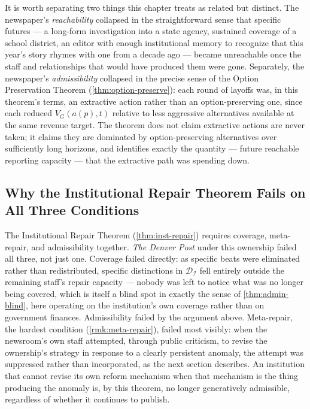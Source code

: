 \documentclass[12pt,twoside,openright]{book}
\begin{document}
It is worth separating two things this chapter treats as
related but distinct. The newspaper's \emph{reachability}
collapsed in the straightforward sense that specific futures ---
a long-form investigation into a state agency, sustained
coverage of a school district, an editor with enough institutional
memory to recognize that this year's story rhymes with one from
a decade ago --- became unreachable once the staff and
relationships that would have produced them were gone.
Separately, the newspaper's \emph{admissibility} collapsed in the
precise sense of the Option Preservation Theorem
(\cref{thm:option-preserve}): each round of layoffs was, in this
theorem's terms, an extractive action rather than an
option-preserving one, since each reduced $V_G(a(p), t)$ relative
to less aggressive alternatives available at the same
revenue target. The theorem does not claim extractive actions
are never taken; it claims they are dominated by option-preserving
alternatives over sufficiently long horizons, and identifies
exactly the quantity --- future reachable reporting capacity ---
that the extractive path was spending down.

\subsection{Why the Institutional Repair Theorem Fails on All Three Conditions}

The Institutional Repair Theorem (\cref{thm:inst-repair})
requires coverage, meta-repair, and admissibility together.
\emph{The Denver Post} under this ownership failed all three, not
just one. Coverage failed directly: as specific beats were
eliminated rather than redistributed, specific distinctions in
$\mathcal{D}_\mathcal{I}$ fell entirely outside the remaining
staff's repair capacity --- nobody was left to notice what was no
longer being covered, which is itself a blind spot in exactly the
sense of \cref{thm:admin-blind}, here operating on the
institution's own coverage rather than on government finances.
Admissibility failed by the argument above. Meta-repair, the
hardest condition (\cref{rmk:meta-repair}), failed most visibly: when
the newsroom's own staff attempted, through public criticism, to
revise the ownership's strategy in response to a clearly
persistent anomaly, the attempt was suppressed rather than
incorporated, as the next section describes. An institution that
cannot revise its own reform mechanism when that mechanism is
the thing producing the anomaly is, by this theorem, no longer
generatively admissible, regardless of whether it continues to
publish.
\end{document}
